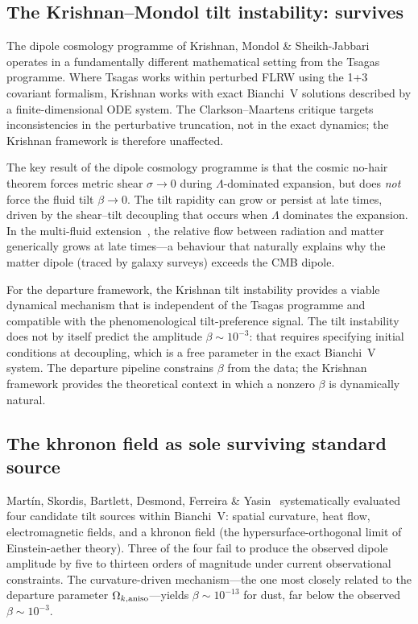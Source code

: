 \subsection{The Krishnan--Mondol tilt instability: survives}
\label{sec:disc-krishnan}

The dipole cosmology programme of Krishnan, Mondol \&
Sheikh-Jabbari~\cite{Krishnan2023} operates in a
fundamentally different mathematical setting from the
Tsagas programme.  Where Tsagas works within perturbed
FLRW using the 1+3 covariant formalism, Krishnan works
with exact Bianchi~V solutions described by a
finite-dimensional ODE system.  The Clarkson--Maartens
critique targets inconsistencies in the perturbative
truncation, not in the exact dynamics; the Krishnan
framework is therefore unaffected.

The key result of the dipole cosmology programme is that
the cosmic no-hair theorem forces metric shear
$\sigma \to 0$ during $\Lambda$-dominated expansion, but
does \emph{not} force the fluid tilt $\beta \to 0$.  The
tilt rapidity can grow or persist at late times, driven by
the shear--tilt decoupling that occurs when
$\Lambda$ dominates the expansion.  In the multi-fluid
extension~\cite{Krishnan2023}, the relative flow between
radiation and matter generically grows at late times---a
behaviour that naturally explains why the matter dipole
(traced by galaxy surveys) exceeds the CMB dipole.

For the departure framework, the Krishnan tilt instability
provides a viable dynamical mechanism that is independent
of the Tsagas programme and compatible with the
phenomenological tilt-preference signal.  The tilt instability does not
by itself predict the amplitude $\beta \sim 10^{-3}$:
that requires specifying initial conditions at decoupling,
which is a free parameter in the exact Bianchi~V system.
The departure pipeline constrains $\beta$ from the data;
the Krishnan framework provides the theoretical context
in which a nonzero $\beta$ is dynamically natural.


\subsection{The khronon field as sole surviving standard source}
\label{sec:disc-khronon}

Mart{\'i}n, Skordis, Bartlett, Desmond, Ferreira \&
Yasin~\cite{MartinSkordis2025} systematically evaluated
four candidate tilt sources within Bianchi~V: spatial
curvature, heat flow, electromagnetic fields, and a
khronon field (the hypersurface-orthogonal limit of
Einstein-aether theory).  Three of the four fail to
produce the observed dipole amplitude by five to thirteen
orders of magnitude under current observational constraints.
The curvature-driven mechanism---the one most closely
related to the departure parameter
$\Omega_{k,\mathrm{aniso}}$---yields $\beta \sim 10^{-13}$ for dust,
far below the observed $\beta \sim 10^{-3}$.

